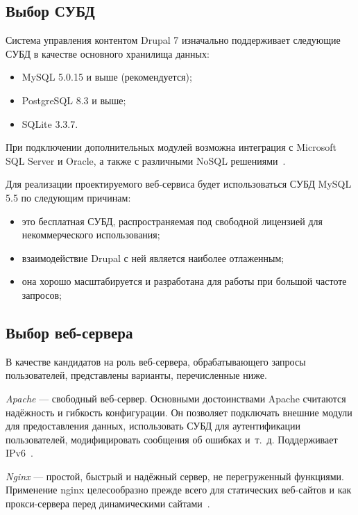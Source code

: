 \subsection{Выбор СУБД}
\label{ssec:choice_db}

Система управления контентом Drupal 7 изначально поддерживает следующие СУБД 
в качестве основного хранилища данных:
\begin{itemize} 
\item
  MySQL 5.0.15 и выше (рекомендуется);

\item
  PostgreSQL 8.3 и выше;

\item
  SQLite 3.3.7.
\end{itemize}

При подключении дополнительных модулей возможна интеграция с Microsoft SQL Server и Oracle,
а также с различными NoSQL решениями~\cite{drupal_database}.

Для реализации проектируемого веб-сервиса будет использоваться СУБД MySQL 5.5 по следующим причинам:
\begin{itemize}
\item
  это бесплатная СУБД, распространяемая под свободной лицензией для некоммерческого использования;
\item
  взаимодействие Drupal с ней является наиболее отлаженным;
\item
  она хорошо масштабируется и разработана для работы при большой частоте запросов;
\end{itemize}

\subsection{Выбор веб-сервера}
\label{ssec:choice_web-server}

В качестве кандидатов на роль веб-сервера, обрабатывающего запросы пользователей,
представлены варианты, перечисленные ниже.

\textit{Apache} --- свободный веб-сервер. Основными достоинствами Apache считаются надёжность и гибкость конфигурации.
Он позволяет подключать внешние модули для предоставления данных, использовать 
СУБД для аутентификации пользователей, модифицировать сообщения об ошибках
и~т.~д. Поддерживает IPv6~\cite{wiki_apache}.

\textit{Nginx} --- простой, быстрый и надёжный сервер, не перегруженный функциями.
Применение nginx целесообразно прежде всего для статических веб-сайтов
и как прокси-сервера перед динамическими сайтами~\cite{wiki_nginx}.

